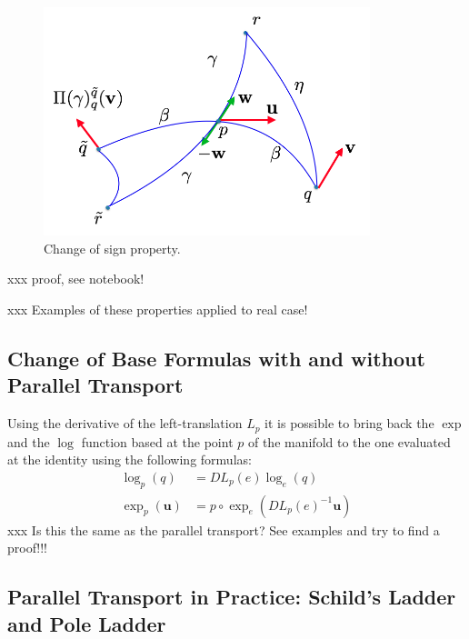\begin{figure}[htbp]
	\centering
	\includegraphics[width=9.5cm]{figures/sign_1.png}
	\caption{Change of sign property.}
	\label{fig:sign_propr}
\end{figure}


\noindent
xxx proof, see notebook!

\noindent
xxx Examples of these properties applied to real case!

\subsection{Change of Base Formulas with and without Parallel Transport}
Using the derivative of the left-translation $L_{p}$ it is possible to bring back the $\exp$ and the $\log$ function based at the point $p$ of the manifold to the one evaluated at the identity using the following formulas:
\begin{align*}
\log _{p}(q)  &= DL_{p}(e) \log _{e}(q)  \\
\exp _{p}(\mathbf{u})  &= p\circ \exp_{e} (DL_{p}(e)^{-1} \mathbf{u})
\end{align*}
xxx Is this the same as the parallel transport? See examples and try to find a proof!!!


\subsection{Parallel Transport in Practice: Schild's Ladder and Pole Ladder}




